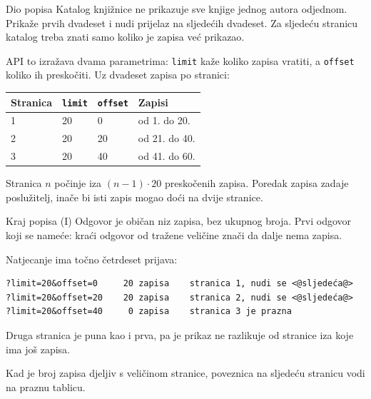 
\begin{frame}{Dio popisa}
Katalog knjižnice ne prikazuje sve knjige jednog autora odjednom. Prikaže prvih dvadeset i nudi prijelaz na sljedećih dvadeset. Za sljedeću stranicu katalog treba znati samo koliko je zapisa već prikazao.

\vspace{0.6em}
API to izražava dvama parametrima: \texttt{limit} kaže koliko zapisa vratiti, a \texttt{offset} koliko ih preskočiti. Uz dvadeset zapisa po stranici:

\vspace{0.4em}
\begin{center}
{\small
\setlength{\tabcolsep}{8pt}
\renewcommand{\arraystretch}{1.3}
\begin{tabular}{@{}L{2.2cm}L{1.8cm}L{1.8cm}L{3.2cm}@{}}
  \toprule
  \textbf{Stranica} & \texttt{limit} & \texttt{offset} & \textbf{Zapisi} \\
   & 20 & 0  & od 1. do 20. \\
  2 & 20 & 20 & od 21. do 40. \\
  3 & 20 & 40 & od 41. do 60. \\
  \bottomrule
\end{tabular}
}
\end{center}

\vspace{0.4em}
Stranica $n$ počinje iza $(n-1)\cdot 20$ preskočenih zapisa. Poredak zapisa zadaje poslužitelj, inače bi isti zapis mogao doći na dvije stranice.
\end{frame}

\begin{frame}[fragile]{Kraj popisa (I)}
Odgovor je običan niz zapisa, bez ukupnog broja. Prvi odgovor koji se nameće: kraći odgovor od tražene veličine znači da dalje nema zapisa.

\vspace{0.3em}
Natjecanje ima točno četrdeset prijava:

\begin{lstlisting}[keepspaces]
?limit=20&offset=0     20 zapisa    stranica 1, nudi se <@sljedeća@>
?limit=20&offset=20    20 zapisa    stranica 2, nudi se <@sljedeća@>
?limit=20&offset=40     0 zapisa    stranica 3 je prazna
\end{lstlisting}

\vspace{0.4em}
Druga stranica je puna kao i prva, pa je prikaz ne razlikuje od stranice iza koje ima još zapisa.

\vspace{0.4em}
Kad je broj zapisa djeljiv s veličinom stranice, poveznica na sljedeću stranicu vodi na praznu tablicu.
\end{frame}

